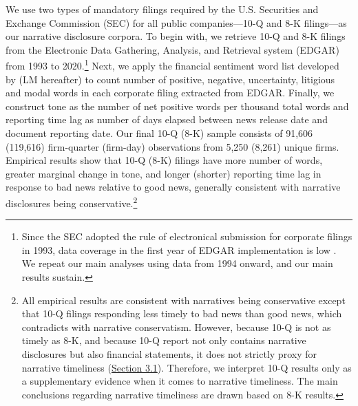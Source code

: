 \documentclass[a4paper]{article}
\begin{document}
\begin{spacing}{2}
We use two types of mandatory filings required by the U.S. Securities and Exchange Commission (SEC) for all public companies---10-Q and 8-K filings---as our narrative disclosure corpora. To begin with, we retrieve 10-Q and 8-K filings from the Electronic Data Gathering, Analysis, and Retrieval system (EDGAR) from 1993 to 2020.\footnote{Since the SEC adopted the rule of electronical submission for corporate filings in 1993, data coverage in the first year of EDGAR implementation is low . We repeat our main analyses using data from 1994 onward, and our main results sustain.} Next, we apply the financial sentiment word list developed by  (LM hereafter) to count number of positive, negative, uncertainty, litigious and modal words in each corporate filing extracted from EDGAR. Finally, we construct tone as the number of net positive words per thousand total words and reporting time lag as number of days elapsed between news release date and document reporting date. Our final 10-Q (8-K) sample consists of 91,606 (119,616) firm-quarter (firm-day) observations from 5,250 (8,261) unique firms. Empirical results show that 10-Q (8-K) filings have more number of words, greater marginal change in tone, and longer (shorter) reporting time lag in response to bad news relative to good news, generally consistent with narrative disclosures being conservative.\footnote{All empirical results are consistent with narratives being conservative except that 10-Q filings responding less timely to bad news than good news, which contradicts with narrative conservatism. However, because 10-Q is not as timely as 8-K, and because 10-Q report not only contains narrative disclosures but also financial statements, it does not strictly proxy for narrative timeliness (\hyperref[sec3.1]{Section 3.1}). Therefore, we interpret 10-Q results only as a supplementary evidence when it comes to narrative timeliness. The main conclusions regarding narrative timeliness are drawn based on 8-K results.}



\end{spacing}
\end{document}
